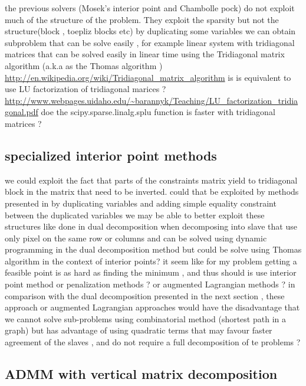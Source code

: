\documentclass[11pt]{article}
\begin{document}
the previous solvers (Mosek's interior point and Chambolle pock)
do not exploit much of the structure of the problem. They exploit the sparsity but not the structure(block , toepliz blocks etc)
 by duplicating some variables we can obtain subproblem that can be solve easily , for example linear system with tridiagonal matrices 
 that can be solved easily in linear time using the 
 Tridiagonal matrix algorithm (a.k.a as the Thomas algorithm )
 \url{http://en.wikipedia.org/wiki/Tridiagonal_matrix_algorithm}
 is is equivalent to use LU factorization of tridiagonal marices 
 ?
 \url{http://www.webpages.uidaho.edu/~barannyk/Teaching/LU_factorization_tridiagonal.pdf}
doe the scipy.sparse.linalg.splu function is faster with tridiagonal matrices ? 

\subsection{specialized interior point methods}

we could exploit the fact that parts of the constraints matrix yield to tridiagonal block in the matrix that need to be inverted.
could that be exploited by methods presented in \cite{Gondzio2003,Grothey2007}
by duplicating variables and adding simple equality constraint between the duplicated variables we may be able to better exploit these structures like done in dual decomposition when decomposing into slave that use only pixel on the same row or columns and can be solved using dynamic programming in the dual decomposition method but could be solve using Thomas algorithm in the context of interior points?
it seem like for my problem getting a feasible point is as hard as finding the minimum , and thus should is use interior point method or penalization methods ? or augmented Lagrangian methods ? 
in comparison with the dual decomposition presented in the next section , these approach or augmented Lagrangian approaches  would have the disadvantage that we cannot solve sub-problems using combinatorial method (shortest path in a graph) but has advantage of using quadratic terms that may favour faster agreement of the slaves , and do not require a full decomposition of te problems ? 
 




\subsection{ADMM with vertical matrix decomposition}
\end{document}
